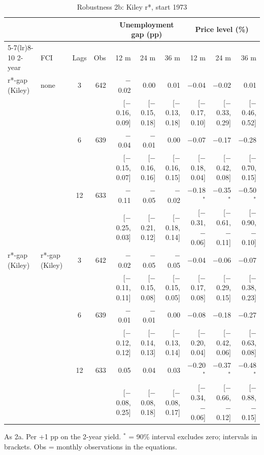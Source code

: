 \begin{table}[p]\centering\footnotesize\setlength{\tabcolsep}{2.2pt}
\caption{Robustness 2b: Kiley r*, start 1973}\label{tab:R2b}
\begin{tabular}{llcrrrrrrr}\toprule
 & & & & \multicolumn{3}{c}{Unemployment gap (pp)} & \multicolumn{3}{c}{Price level (\%)}\\ \cmidrule(lr){5-7}\cmidrule(lr){8-10}
2-year & FCI & Lags & Obs & 12 m & 24 m & 36 m & 12 m & 24 m & 36 m\\ \midrule
r*-gap (Kiley) & none & 3 & 642 & $-$0.02 & 0.00 & 0.01 & $-$0.04 & $-$0.02 & 0.01\\
 & & & & {\scriptsize [$-$0.16, 0.09]} & {\scriptsize [$-$0.15, 0.18]} & {\scriptsize [$-$0.13, 0.18]} & {\scriptsize [$-$0.17, 0.10]} & {\scriptsize [$-$0.33, 0.29]} & {\scriptsize [$-$0.46, 0.52]}\\
 &  & 6 & 639 & $-$0.04 & $-$0.01 & 0.00 & $-$0.07 & $-$0.17 & $-$0.28\\
 & & & & {\scriptsize [$-$0.15, 0.07]} & {\scriptsize [$-$0.16, 0.16]} & {\scriptsize [$-$0.16, 0.15]} & {\scriptsize [$-$0.18, 0.04]} & {\scriptsize [$-$0.42, 0.08]} & {\scriptsize [$-$0.70, 0.15]}\\
 &  & 12 & 633 & $-$0.11 & $-$0.05 & $-$0.02 & $-$0.18$^{*}$ & $-$0.35$^{*}$ & $-$0.50$^{*}$\\
 & & & & {\scriptsize [$-$0.25, 0.03]} & {\scriptsize [$-$0.21, 0.12]} & {\scriptsize [$-$0.18, 0.14]} & {\scriptsize [$-$0.31, $-$0.06]} & {\scriptsize [$-$0.61, $-$0.11]} & {\scriptsize [$-$0.90, $-$0.10]}\\
r*-gap (Kiley) & r*-gap (Kiley) & 3 & 642 & $-$0.02 & $-$0.05 & $-$0.05 & $-$0.04 & $-$0.06 & $-$0.07\\
 & & & & {\scriptsize [$-$0.11, 0.11]} & {\scriptsize [$-$0.15, 0.08]} & {\scriptsize [$-$0.15, 0.05]} & {\scriptsize [$-$0.17, 0.08]} & {\scriptsize [$-$0.29, 0.15]} & {\scriptsize [$-$0.38, 0.23]}\\
 &  & 6 & 639 & $-$0.01 & $-$0.01 & 0.00 & $-$0.08 & $-$0.18 & $-$0.27\\
 & & & & {\scriptsize [$-$0.12, 0.12]} & {\scriptsize [$-$0.14, 0.13]} & {\scriptsize [$-$0.13, 0.14]} & {\scriptsize [$-$0.20, 0.04]} & {\scriptsize [$-$0.42, 0.06]} & {\scriptsize [$-$0.63, 0.08]}\\
 &  & 12 & 633 & 0.05 & 0.04 & 0.03 & $-$0.20$^{*}$ & $-$0.37$^{*}$ & $-$0.48$^{*}$\\
 & & & & {\scriptsize [$-$0.08, 0.25]} & {\scriptsize [$-$0.08, 0.18]} & {\scriptsize [$-$0.08, 0.17]} & {\scriptsize [$-$0.34, $-$0.06]} & {\scriptsize [$-$0.66, $-$0.12]} & {\scriptsize [$-$0.88, $-$0.15]}\\
\bottomrule\end{tabular}
\par\smallskip\parbox{0.96\linewidth}{\scriptsize As 2a. Per +1 pp on the 2-year yield. $^{*}$ = 90\% interval excludes zero; intervals in brackets. Obs = monthly observations in the equations.}
\end{table}
